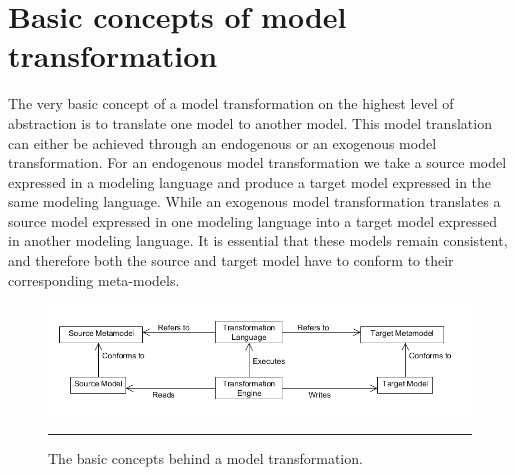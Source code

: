 \section{Basic concepts of model transformation}

The very basic concept of a model transformation on the highest level of
abstraction is to translate one model to another model. This model translation
can either be achieved through an endogenous or an exogenous model
transformation. For an endogenous model transformation we take a source model
expressed in a modeling language and produce a target model expressed in the
same modeling language. While an exogenous model transformation translates a
source model expressed in one modeling language into a target model expressed in
another modeling language. It is essential that these models remain consistent,
and therefore both the source and target model have to conform to their
corresponding meta-models.

\begin{figure}[H]
  \centering
    \includegraphics[scale=0.5]{./Figures/BasicTransformation.png}
    \rule{35em}{0.5pt}
  \caption[Basic Model Transformation]
  {The basic concepts behind a model transformation.}
  \label{fig:BasicTransformation}
\end{figure}


